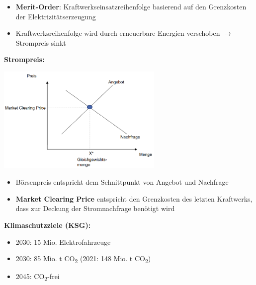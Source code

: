 \begin{itemize}
	\item \textbf{Merit-Order}: Kraftwerkseinsatzreihenfolge basierend auf den Grenzkosten der Elektrizitätserzeugung
	\item Kraftwerksreihenfolge wird durch erneuerbare Energien verschoben $\rightarrow$ Strompreis sinkt
\end{itemize}
\pagebreak
\textbf{Strompreis:}
\begin{center}
	\includegraphics[width=0.6\textwidth]{images/strompreis.png}
\end{center}
\begin{itemize}
	\item Börsenpreis entspricht dem Schnittpunkt von Angebot und Nachfrage
	\item \textbf{Market Clearing Price} entspricht den Grenzkosten des letzten Kraftwerks, dass zur Deckung der Stromnachfrage benötigt wird
\end{itemize}
\bigskip
\textbf{Klimaschutzziele (KSG):}
\begin{itemize}
	\item 2030: 15 Mio. Elektrofahrzeuge
	\item 2030: 85 Mio. \si{\tonne} CO\textsubscript{2} (2021: 148 Mio. \si{\tonne} CO\textsubscript{2})
	\item 2045: CO\textsubscript{2}-frei
\end{itemize}
